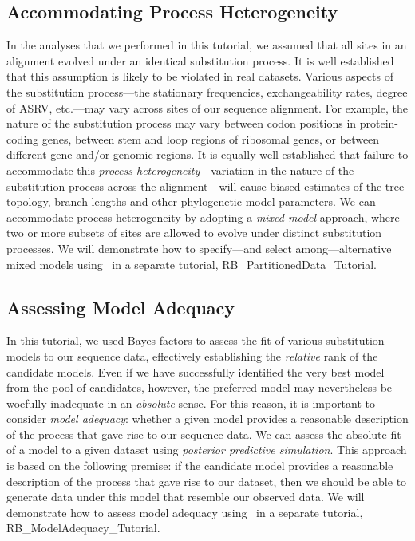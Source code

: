 \subsection{Accommodating Process Heterogeneity}
In the analyses that we performed in this tutorial, we assumed that all sites in an alignment evolved under an identical substitution process.
It is well established that this assumption is likely to be violated in real datasets.
Various aspects of the substitution process---the stationary frequencies, exchangeability rates, degree of ASRV, etc.---may vary across sites of our sequence alignment.
For example, the nature of the substitution process may vary between codon positions in protein-coding genes, between stem and loop regions of ribosomal genes, or between different gene and/or genomic regions. 
It is equally well established that failure to accommodate this \textit{process heterogeneity}---variation in the nature of the substitution process across the alignment---will cause biased estimates of the tree topology, branch lengths and other phylogenetic model parameters.
We can accommodate process heterogeneity by adopting a \emph{mixed-model} approach, where two or more subsets of sites are allowed to evolve under distinct substitution processes.
We will demonstrate how to specify---and select among---alternative mixed models using \RevBayes~in a separate tutorial, RB\_PartitionedData\_Tutorial.

\subsection{Assessing Model Adequacy}
In this tutorial, we used Bayes factors to assess the fit of various substitution models to our sequence data, effectively establishing the \emph{relative} rank of the candidate models.
Even if we have successfully identified the very best model from the pool of candidates, however, the preferred model may nevertheless be woefully inadequate in an \emph{absolute} sense. 
For this reason, it is important to consider \emph{model adequacy}: whether a given model provides a reasonable description of the process that gave rise to our sequence data. 
We can assess the absolute fit of a model to a given dataset using \emph{posterior predictive simulation}.
This approach is based on the following premise: if the candidate model provides a reasonable description of the process that gave rise to our dataset, then we should be able to generate data under this model that resemble our observed data.
We will demonstrate how to assess model adequacy using \RevBayes~in a separate tutorial, RB\_ModelAdequacy\_Tutorial.

